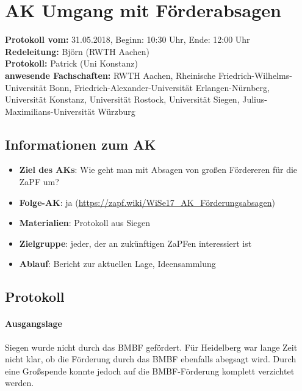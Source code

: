 
\section{AK Umgang mit Förderabsagen}

	\textbf{Protokoll vom:} 31.05.2018,
	Beginn: 10:30 Uhr,
	Ende: 12:00 Uhr \\
	\textbf{Redeleitung:} Björn (RWTH Aachen) \\
	\textbf{Protokoll:} Patrick (Uni Konstanz) \\
	\textbf{anwesende Fachschaften:} RWTH Aachen, Rheinische Friedrich-Wilhelms-Universität Bonn, Friedrich-Alexander-Universität Erlangen-Nürnberg, Universität Konstanz, Universität Rostock, Universität Siegen, Julius-Maximilians-Universität Würzburg

	\subsection*{Informationen zum AK}
		\begin{itemize}
			\item \textbf{Ziel des AKs}: Wie geht man mit Absagen von großen Fördereren für die ZaPF um?
			\item \textbf{Folge-AK}: ja (\url{https://zapf.wiki/WiSe17_AK_Förderungsabsagen})
      \item \textbf{Materialien}: Protokoll aus Siegen
			\item \textbf{Zielgruppe}: jeder, der an zukünftigen ZaPFen interessiert ist
			\item \textbf{Ablauf}: Bericht zur aktuellen Lage, Ideensammlung
		\end{itemize}

  \subsection*{Protokoll}
    \paragraph{Ausgangslage}
      Siegen wurde nicht durch das BMBF gefördert. Für Heidelberg war lange Zeit nicht klar, ob die Förderung durch das BMBF ebenfalls abegsagt wird.
      Durch eine Großspende konnte jedoch auf die BMBF-Förderung komplett verzichtet werden.

